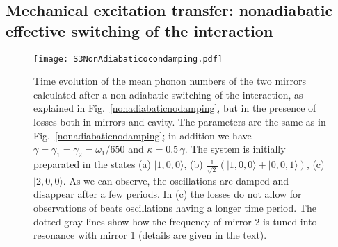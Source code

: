 \documentclass[aps,pra,twocolumn,floatfix,longbibliography, superscriptaddress]{revtex4-1}
\newcommand{\ket}[1]{|#1\rangle}
\newcommand{\figref}[1]{\mbox{Fig.~\ref{#1}}}
\begin{document}
\subsection{Mechanical excitation transfer: nonadiabatic effective switching of the interaction }
\label{Subsec:F}
\begin{figure}[h!]
	\centering
	\texttt{[image: S3NonAdiabaticocondamping.pdf]}
	\caption{Time evolution of the mean phonon numbers of the two mirrors calculated after a non-adiabatic switching of the interaction, as explained in  \figref{nonadiabaticnodamping}, but in the presence of losses both in mirrors and cavity. The parameters are the same as in \figref{nonadiabaticnodamping}; in addition we have $\gamma=\gamma_1=\gamma_2=\omega_1/650$ and $\kappa=0.5\, \gamma$.
		The system is initially preparated in the states (a) $\ket{1,0,0}$, (b) $\frac{1}{\sqrt{2}}(\ket{1,0,0}+\ket{0,0,1})$, (c) $\ket{2,0,0}$. As we can observe, the oscillations are damped and disappear after a few periods. In (c) the losses do not allow for observations of  beats oscillations having a longer time period. The dotted gray lines show how the frequency of mirror 2 is tuned into resonance with mirror 1 (details are given in the text).
	}\label{nonadiabaticwithdamping}
\end{figure}
\end{document}
